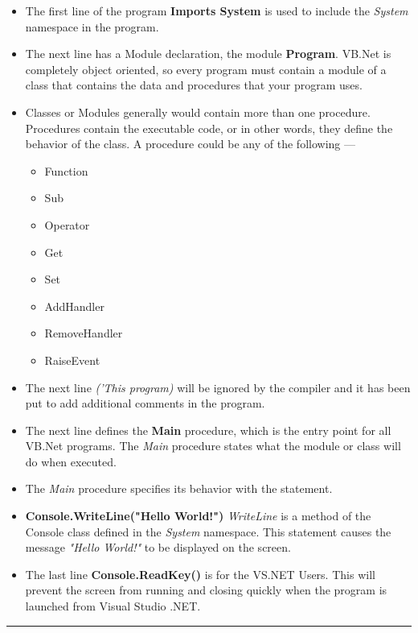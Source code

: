 \documentclass[11pt,dvipsnames,cmyk]{article}
\begin{document}
	\begin{itemize}
		\item The first line of the program \textbf{Imports System} is used to include the \emph{System} namespace in the program.
		
		\item The next line has a Module declaration, the module \textbf{Program}. VB.Net is completely object oriented, so every program must contain a module of a class that contains the data and procedures that your program uses.
		
		\item Classes or Modules generally would contain more than one procedure. Procedures contain the executable code, or in other words, they define the behavior of the class. A procedure could be any of the following ---
		\begin{itemize}
			\item Function
			\item Sub
			\item Operator
			\item Get
			\item Set
			\item AddHandler
			\item RemoveHandler
			\item RaiseEvent
		\end{itemize}
		
		\item The next line \emph{('This program)} will be ignored by the compiler and it has been put to add additional comments in the program.
		
		\item The next line defines the \textbf{Main} procedure, which is the entry point for all VB.Net programs. The \emph{Main} procedure states what the module or class will do when executed.
		
		\item The \emph{Main} procedure specifies its behavior with the statement.
		
		\item \textbf{Console.WriteLine("Hello World!")} \emph{WriteLine} is a method of the Console class defined in the \emph{System} namespace. This statement causes the message \emph{"Hello World!"} to be displayed on the screen.
		
		\item The last line \textbf{Console.ReadKey()} is for the VS.NET Users. This will prevent the screen from running and closing quickly when the program is launched from Visual Studio .NET.
	\end{itemize}	
	\hfill\break\rule{6.27in}{1.2pt}
	
\end{document}
